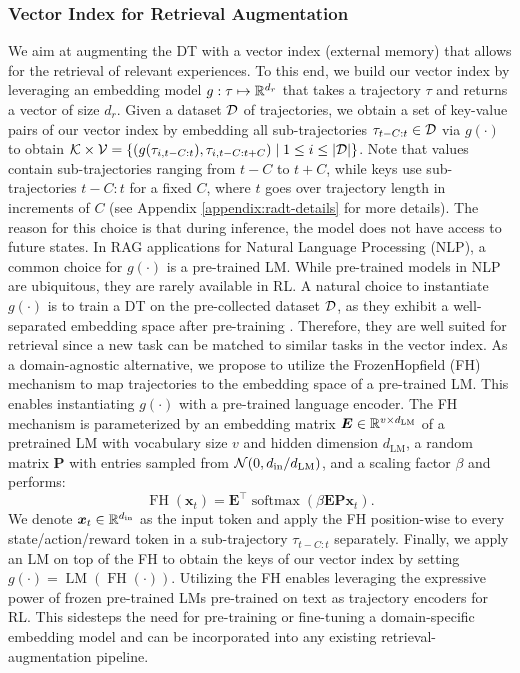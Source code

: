 \documentclass{article}
\newcommand\Bx{\bm{x}}
\newcommand\BE{\bm{E}}
\newcommand\BP{\bm{P}}
\newcommand{\cK}{\mathcal{K}} \newcommand{\cL}{\mathcal{L}}
\begin{document}
\subsubsection{Vector Index for Retrieval Augmentation} \label{sec:vector-index}
We aim at augmenting the DT with a vector index (external memory) that allows for the retrieval of relevant experiences.
To this end, we build our vector index by leveraging an embedding model $g : \tau \mapsto \mathbb{R}^{d_r}$ that takes a trajectory $\tau$ and returns a vector of size $d_r$.
Given a dataset $\mathcal{D}$ of trajectories, we obtain a set of key-value pairs of our vector index by embedding all sub-trajectories $\tau_{t-C:t} \in \mathcal{D}$ via $g(\cdot)$ to obtain $\cK \times \cV = \{(g(\tau_{i, t-C:t}), \tau_{i, t-C:t+C}) \mid 1 \leq i \leq |\cD| \}$.
Note that values contain sub-trajectories ranging from $t-C$ to $t+C$, while keys use sub-trajectories $t-C:t$ for a fixed $C$, where $t$ goes over trajectory length in increments of $C$ (see Appendix \ref{appendix:radt-details} for more details).
The reason for this choice is that during inference, the model does not have access to future states.
In RAG applications for Natural Language Processing (NLP), a common choice for $g(\cdot)$ is a pre-trained LM.
While pre-trained models in NLP are ubiquitous, they are rarely available in RL.
A natural choice to instantiate $g(\cdot)$ is to train a DT on the pre-collected dataset $\mathcal{D}$, as they exhibit a well-separated embedding space after pre-training \citep{Schmied:23}.
Therefore, they are well suited for retrieval since a new task can be matched to similar tasks in the vector index.
As a domain-agnostic alternative, we propose to utilize the FrozenHopfield (FH) mechanism \citep{Paischer:22} to map trajectories to the embedding space of a pre-trained LM.
This enables instantiating $g(\cdot)$ with a pre-trained language encoder.
The FH mechanism is parameterized by an embedding matrix $\BE \in \dR^{v\times d_{\text{LM}}}$ of a pretrained LM with vocabulary size $v$ and hidden dimension $d_{\text{LM}}$, a random matrix $\BP$ with entries sampled from $\mathcal{N}(0, d_{\text{in}}/d_{\text{LM}})$, and a scaling factor $\beta$ and performs:
\begin{equation}\label{eq:frozenhopfield}
    \operatorname{FH}(\Bx_t) = \BE^\top \operatorname{softmax}(\beta \BE \BP\Bx_t).
\end{equation}
We denote $\Bx_t \in \dR^{d_{\text{in}}}$ as the input token and apply the FH position-wise to every state/action/reward token in a sub-trajectory $\tau_{t-C:t}$ separately.
Finally, we apply an LM on top of the FH to obtain the keys of our vector index by setting $g(\cdot) = \operatorname{LM}(\operatorname{FH}(\cdot))$.
Utilizing the FH enables leveraging the expressive power of frozen pre-trained LMs pre-trained on text as trajectory encoders for RL.
This sidesteps the need for pre-training or fine-tuning a domain-specific embedding model and can be incorporated into any existing retrieval-augmentation pipeline.
\end{document}
